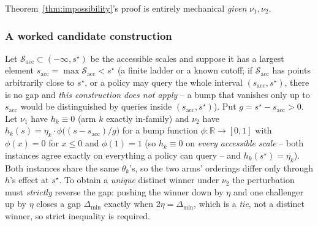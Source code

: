\begin{remark}
\label{rem:impossibility-construction}
Theorem~\ref{thm:impossibility}'s proof is entirely mechanical \emph{given} $\nu_1,
\nu_2$. 
\end{remark}

\subsubsection{A worked candidate construction}
\label{sec:theorem2-construction}

Let $\mathcal{S}_{\mathrm{acc}} \subset (-\infty, s^\star)$ be the accessible scales and
suppose it has a largest element $s_{\mathrm{acc}} = \max \mathcal{S}_{\mathrm{acc}} <
s^\star$ (a finite ladder or a known cutoff; if $\mathcal{S}_{\mathrm{acc}}$ has points
arbitrarily close to $s^\star$, or a policy may query the whole interval
$(s_{\mathrm{acc}}, s^\star)$, there is no gap and \emph{this construction does not
apply} -- a bump that vanishes only up to $s_{\mathrm{acc}}$ would be distinguished by
queries inside $(s_{\mathrm{acc}}, s^\star)$). Put $g = s^\star - s_{\mathrm{acc}} > 0$.
Let $\nu_1$ have $h_k \equiv 0$ (arm $k$ exactly in-family) and $\nu_2$ have
$h_k(s) = \eta_k \cdot \phi\big((s - s_{\mathrm{acc}})/g\big)$ for a bump function $\phi:
\mathbb{R} \to [0,1]$ with $\phi(x) = 0$ for $x \le 0$ and $\phi(1) = 1$ (so $h_k \equiv
0$ on \emph{every accessible scale} -- both instances agree exactly on everything a
policy can query -- and $h_k(s^\star) = \eta_k$). Both instances share the same
$\theta_k$'s, so the two arms' orderings differ only through $h$'s effect at $s^\star$.
To obtain a \emph{unique} distinct winner under $\nu_2$ the perturbation must
\emph{strictly} reverse the gap: pushing the winner down by $\eta$ and one challenger up
by $\eta$ closes a gap $\Delta_{\min}$ exactly when $2\eta = \Delta_{\min}$, which is a
\emph{tie}, not a distinct winner, so strict inequality is required.

